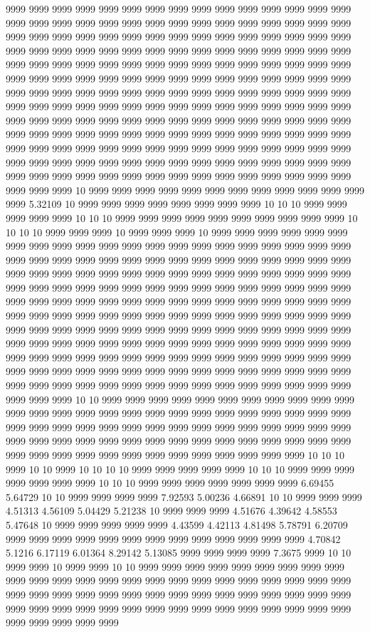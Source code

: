 9999 9999 9999 9999 9999 9999 9999 9999 9999 9999 9999 9999 9999 9999 9999 9999 9999 9999 9999 9999 9999 9999 9999 9999 9999 9999 9999 9999 9999 9999 9999 9999 9999 9999 9999 9999 9999 9999 9999 9999 9999 9999 9999 9999 9999 9999 9999 9999 9999 9999 9999 9999 9999 9999 9999 9999 9999 9999 9999 9999 9999 9999 9999 9999 9999 9999 9999 9999 9999 9999 9999 9999 9999 9999 9999 9999 9999 9999 9999 9999 9999 9999 9999 9999 9999 9999 9999 9999 9999 9999 9999 9999 9999 9999 9999 9999 9999 9999 9999 9999 9999 9999 9999 9999 9999 9999 9999 9999 9999 9999 9999 9999 9999 9999 9999 9999 9999 9999 9999 9999 9999 9999 9999 9999 9999 9999 9999 9999 9999 9999 9999 9999 9999 9999 9999 9999 9999 9999 9999 9999 9999 9999 9999 9999 9999 9999 9999 9999 9999 9999 9999 9999 9999 9999 9999 9999 9999 9999 9999 9999 9999 9999 9999 9999 9999 9999 9999 9999 9999 9999 9999 9999 9999 9999 9999 9999 9999 9999 9999 9999 9999 9999 9999 9999 9999 9999 9999 9999 9999 9999 9999 9999 9999 9999 9999 9999 9999 9999 10 9999 9999 9999 9999 9999 9999 9999 9999 9999 9999 9999 9999 9999 5.32109 10 9999 9999 9999 9999 9999 9999 9999 9999 10 10 10 9999 9999 9999 9999 9999 10 10 10 9999 9999 9999 9999 9999 9999 9999 9999 9999 9999 10 10 10 10 9999 9999 9999 10 9999 9999 9999 10 9999 9999 9999 9999 9999 9999 9999 9999 9999 9999 9999 9999 9999 9999 9999 9999 9999 9999 9999 9999 9999 9999 9999 9999 9999 9999 9999 9999 9999 9999 9999 9999 9999 9999 9999 9999 9999 9999 9999 9999 9999 9999 9999 9999 9999 9999 9999 9999 9999 9999 9999 9999 9999 9999 9999 9999 9999 9999 9999 9999 9999 9999 9999 9999 9999 9999 9999 9999 9999 9999 9999 9999 9999 9999 9999 9999 9999 9999 9999 9999 9999 9999 9999 9999 9999 9999 9999 9999 9999 9999 9999 9999 9999 9999 9999 9999 9999 9999 9999 9999 9999 9999 9999 9999 9999 9999 9999 9999 9999 9999 9999 9999 9999 9999 9999 9999 9999 9999 9999 9999 9999 9999 9999 9999 9999 9999 9999 9999 9999 9999 9999 9999 9999 9999 9999 9999 9999 9999 9999 9999 9999 9999 9999 9999 9999 9999 9999 9999 9999 9999 9999 9999 9999 9999 9999 9999 9999 9999 9999 9999 9999 9999 9999 9999 9999 9999 9999 9999 9999 9999 9999 9999 9999 9999 10 10 9999 9999 9999 9999 9999 9999 9999 9999 9999 9999 9999 9999 9999 9999 9999 9999 9999 9999 9999 9999 9999 9999 9999 9999 9999 9999 9999 9999 9999 9999 9999 9999 9999 9999 9999 9999 9999 9999 9999 9999 9999 9999 9999 9999 9999 9999 9999 9999 9999 9999 9999 9999 9999 9999 9999 9999 9999 9999 9999 9999 9999 9999 9999 9999 9999 9999 9999 9999 9999 10 10 10 9999 10 10 9999 10 10 10 10 9999 9999 9999 9999 9999 10 10 10 9999 9999 9999 9999 9999 9999 9999 10 10 10 9999 9999 9999 9999 9999 9999 9999 6.69455 5.64729 10 10 9999 9999 9999 9999 7.92593 5.00236 4.66891 10 10 9999 9999 9999 4.51313 4.56109 5.04429 5.21238 10 9999 9999 9999 4.51676 4.39642 4.58553 5.47648 10 9999 9999 9999 9999 9999 4.43599 4.42113 4.81498 5.78791 6.20709 9999 9999 9999 9999 9999 9999 9999 9999 9999 9999 9999 9999 9999 4.70842 5.1216 6.17119 6.01364 8.29142 5.13085 9999 9999 9999 9999 7.3675 9999 10 10 9999 9999 10 9999 9999 10 10 9999 9999 9999 9999 9999 9999 9999 9999 9999 9999 9999 9999 9999 9999 9999 9999 9999 9999 9999 9999 9999 9999 9999 9999 9999 9999 9999 9999 9999 9999 9999 9999 9999 9999 9999 9999 9999 9999 9999 9999 9999 9999 9999 9999 9999 9999 9999 9999 9999 9999 9999 9999 9999 9999 9999 9999 9999 9999 9999 